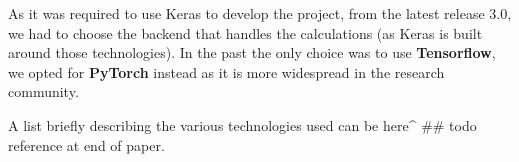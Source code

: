 As it was required to use Keras to develop the project, from the latest release 3.0, we had to choose
the backend that handles the calculations (as Keras is built around those technologies).
In the past the only choice was to use \textbf{Tensorflow}, we opted for \textbf{PyTorch} instead as it
is more widespread in the research community.

A list briefly describing the various technologies used can be here^ ## todo reference at end of paper.